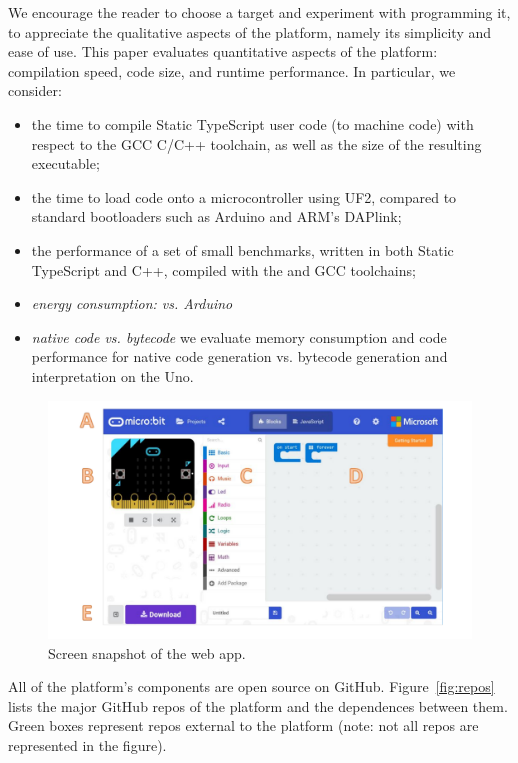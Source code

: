 We encourage the reader to choose a target
and experiment with programming it, to appreciate the
qualitative aspects of the platform, namely its simplicity and ease of use.
This paper evaluates quantitative aspects of the platform:
compilation speed, code size, and runtime performance.  In particular, we
consider:
\begin{itemize}
\item the time to compile Static TypeScript user code (to machine code) with respect
      to the GCC C/C++ toolchain, as well as the size of the resulting executable;
\item the time to load code onto a microcontroller using UF2, compared to standard bootloaders
      such as Arduino and ARM's DAPlink;
\item the performance of a set of small benchmarks, written in both Static TypeScript and C++,
      compiled with the \MC and GCC toolchains;
\item \emph{energy consumption: \CO vs. Arduino}
\item \emph{native code vs. bytecode} we
      evaluate memory consumption and code performance for native code generation
      vs. bytecode generation and interpretation on the Uno.
\end{itemize}


\begin{figure}[t]
      \includegraphics[width=5in]{screenSnapFig.pdf}
  \caption{\label{fig:screenSnap}Screen snapshot of the \MC web app.}
\end{figure}

All of the platform's components are open source on GitHub.
Figure~\ref{fig:repos} lists the major GitHub repos of the platform
and the dependences between them. Green boxes represent repos external to the platform
(note: not all repos are represented in the figure).

